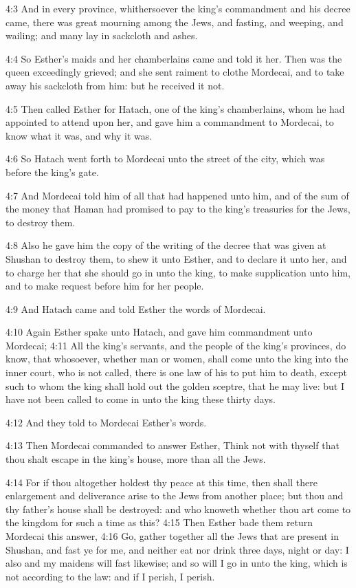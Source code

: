 4:3 And in every province, whithersoever the king's commandment and
his decree came, there was great mourning among the Jews, and fasting,
and weeping, and wailing; and many lay in sackcloth and ashes.

4:4 So Esther's maids and her chamberlains came and told it her. Then
was the queen exceedingly grieved; and she sent raiment to clothe
Mordecai, and to take away his sackcloth from him: but he received it
not.

4:5 Then called Esther for Hatach, one of the king's chamberlains,
whom he had appointed to attend upon her, and gave him a commandment
to Mordecai, to know what it was, and why it was.

4:6 So Hatach went forth to Mordecai unto the street of the city,
which was before the king's gate.

4:7 And Mordecai told him of all that had happened unto him, and of
the sum of the money that Haman had promised to pay to the king's
treasuries for the Jews, to destroy them.

4:8 Also he gave him the copy of the writing of the decree that was
given at Shushan to destroy them, to shew it unto Esther, and to
declare it unto her, and to charge her that she should go in unto the
king, to make supplication unto him, and to make request before him
for her people.

4:9 And Hatach came and told Esther the words of Mordecai.

4:10 Again Esther spake unto Hatach, and gave him commandment unto
Mordecai; 4:11 All the king's servants, and the people of the king's
provinces, do know, that whosoever, whether man or women, shall come
unto the king into the inner court, who is not called, there is one
law of his to put him to death, except such to whom the king shall
hold out the golden sceptre, that he may live: but I have not been
called to come in unto the king these thirty days.

4:12 And they told to Mordecai Esther's words.

4:13 Then Mordecai commanded to answer Esther, Think not with thyself
that thou shalt escape in the king's house, more than all the Jews.

4:14 For if thou altogether holdest thy peace at this time, then shall
there enlargement and deliverance arise to the Jews from another
place; but thou and thy father's house shall be destroyed: and who
knoweth whether thou art come to the kingdom for such a time as this?
4:15 Then Esther bade them return Mordecai this answer, 4:16 Go,
gather together all the Jews that are present in Shushan, and fast ye
for me, and neither eat nor drink three days, night or day: I also and
my maidens will fast likewise; and so will I go in unto the king,
which is not according to the law: and if I perish, I perish.

